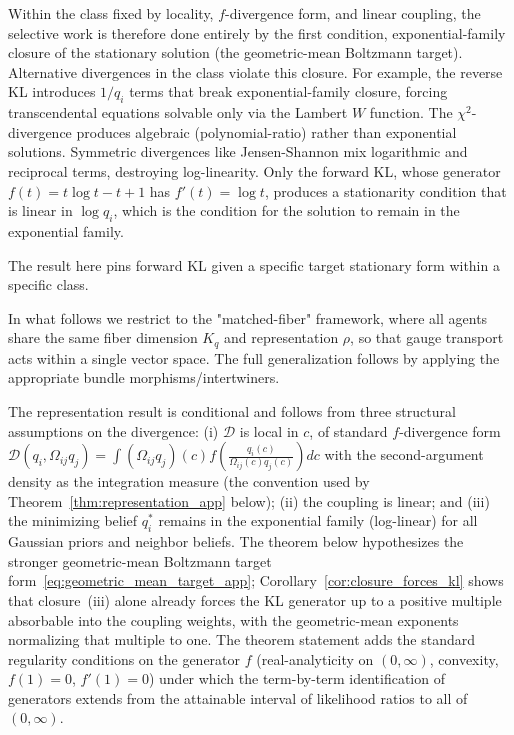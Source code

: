 \documentclass[11pt]{article}
\begin{document}
Within the class fixed by locality, $f$-divergence form, and linear coupling, the selective work is therefore done entirely by the first condition, exponential-family closure of the stationary solution (the geometric-mean Boltzmann target). Alternative divergences in the class violate this closure. For example, the reverse KL introduces $1/q_i$ terms that break exponential-family closure, forcing transcendental equations solvable only via the Lambert $W$ function. The $\chi^2$-divergence produces algebraic (polynomial-ratio) rather than exponential solutions. Symmetric divergences like Jensen-Shannon mix logarithmic and reciprocal terms, destroying log-linearity. Only the forward KL, whose generator $f(t) = t\log t - t + 1$ has $f'(t) = \log t$, produces a stationarity condition that is linear in $\log q_i$, which is the condition for the solution to remain in the exponential family.

The result here pins forward KL given a specific target stationary form within a specific class.

In what follows we restrict to the "matched-fiber" framework, where all agents share the same fiber dimension $K_q$ and representation $\rho$, so that gauge transport acts within a single vector space. The full generalization follows by applying the appropriate bundle morphisms/intertwiners.

The representation result is conditional and follows from three structural assumptions on the divergence: (i) $\mathcal{D}$ is local in $c$, of standard $f$-divergence form $\displaystyle \mathcal{D}(q_i, \Omega_{ij}q_j) = \int (\Omega_{ij}q_j)(c) f\left(\frac{q_i(c)}{\Omega_{ij}(c) q_j(c)}\right) dc$ with the second-argument density as the integration measure (the convention used by Theorem~\ref{thm:representation_app} below); (ii) the coupling is linear; and (iii) the minimizing belief $q_i^*$ remains in the exponential family (log-linear) for all Gaussian priors and neighbor beliefs. The theorem below hypothesizes the stronger geometric-mean Boltzmann target form~\eqref{eq:geometric_mean_target_app}; Corollary~\ref{cor:closure_forces_kl} shows that closure~(iii) alone already forces the KL generator up to a positive multiple absorbable into the coupling weights, with the geometric-mean exponents normalizing that multiple to one. The theorem statement adds the standard regularity conditions on the generator $f$ (real-analyticity on $(0,\infty)$, convexity, $f(1)=0$, $f'(1)=0$) under which the term-by-term identification of generators extends from the attainable interval of likelihood ratios to all of $(0,\infty)$.
\end{document}

